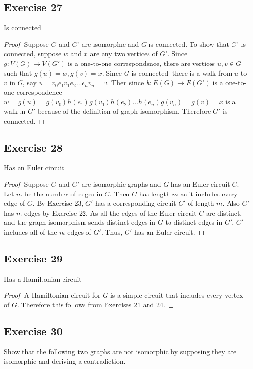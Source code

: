 \documentclass[14pt]{extarticle}
\begin{document}
\subsection{Exercise 27}
Is connected

\begin{proof}
Suppose \(G\) and \(G'\) are isomorphic and \(G\) is connected. To show that \(G'\) is connected, suppose \(w\) and 
\(x\) are any two vertices of \(G'\). Since \(g: V(G) \to V(G')\) is a one-to-one correspondence, there are vertices 
\(u, v \in G\) such that \(g(u) = w, g(v) = x\). Since \(G\) is connected, there is a walk from \(u\) to \(v\) in \(G\), 
say \(u = v_0e_1v_1e_2 \ldots e_nv_n = v\). Then since \(h: E(G) \to E(G')\) is a one-to-one correspondence, \(w = g(u) = 
g(v_0)h(e_1)g(v_1)h(e_2) \ldots h(e_n)g(v_n) = g(v) = x\) is a walk in \(G'\) because of the definition of graph isomorphism. 
Therefore \(G'\) is connected.
\end{proof}

\subsection{Exercise 28}
Has an Euler circuit

\begin{proof}
Suppose \(G\) and \(G'\) are isomorphic graphs and \(G\) has an Euler circuit \(C\). Let \(m\) be the number of edges in 
\(G\). Then \(C\) has length \(m\) as it includes every edge of \(G\). By Exercise 23, \(G'\) has a corresponding circuit 
\(C'\) of length \(m\). Also \(G'\) has \(m\) edges by Exercise 22. As all the edges of the Euler circuit \(C\) are 
distinct, and the graph isomorphism sends distinct edges in \(G\) to distinct edges in \(G'\), \(C'\) includes all of the 
\(m\) edges of \(G'\). Thus, \(G'\) has an Euler circuit.
\end{proof}

\subsection{Exercise 29}
Has a Hamiltonian circuit

\begin{proof}
A Hamiltonian circuit for \(G\) is a simple circuit that includes every vertex of \(G\). Therefore this follows from
Exercises 21 and 24.
\end{proof}

\subsection{Exercise 30}
Show that the following two graphs are not isomorphic by supposing they are isomorphic and deriving a contradiction.
\end{document}
